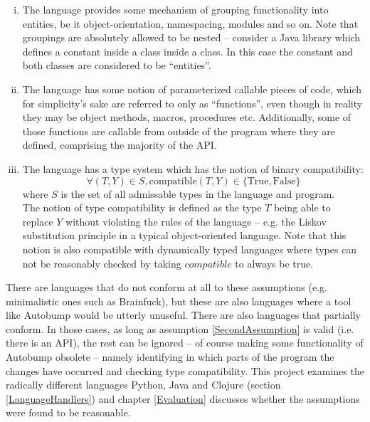 \documentclass{l4proj}
\begin{document}
\begin{enumerate}[(i)]
\item The language provides some mechanism of grouping functionality
into entities, be it object-orientation, namespacing, modules and so
on. Note that groupings are absolutely allowed to be nested --
consider a Java library which defines a constant inside a class inside
a class. In this case the constant and both classes are considered to
be ``entities''.
\item The language has some notion of parameterized callable pieces of
code, which for simplicity's sake are referred to only as ``functions'',
even though in reality they may be object methods, macros, procedures etc.
Additionally, some of those functions are callable from outside of the
program where they are defined, comprising the majority of the API.
\label{SecondAssumption}
\item The language has a type system which has the notion of binary
compatibility:
\begin{equation}
\forall(T,Y) \in S, \mathrm{compatible}(T,Y) \in \{\mathrm{True},\mathrm{False}\}
\end{equation}
where $S$ is the set of all admissable types in the language and
program. \\

The notion of type compatibility is defined as the type $T$ being able
to replace $Y$ without violating the rules of the language -- e.g. the
Liskov substitution principle\cite{Liskov} in a typical
object-oriented language. Note that this notion is also compatible
with dynamically typed languages where types can not be reasonably
checked by taking $compatible$ to always be true.
\end{enumerate}

There are languages that do not conform at all to these assumptions
(e.g. minimalistic ones such as Brainfuck\cite{Brainfuck}), but these
are also languages where a tool like Autobump would be utterly
unuseful. There are also languages that partially conform. In those
cases, as long as assumption \ref{SecondAssumption} is valid (i.e.
there is an API), the rest can be ignored -- of course making some functionality
of Autobump obsolete -- namely identifying in which parts of
the program the changes have occurred and checking type compatibility.
This project examines the radically different languages
Python, Java and Clojure (section \ref{LanguageHandlers}) and chapter
\ref{Evaluation} discusses whether the assumptions were found to be
reasonable.
\end{document}
